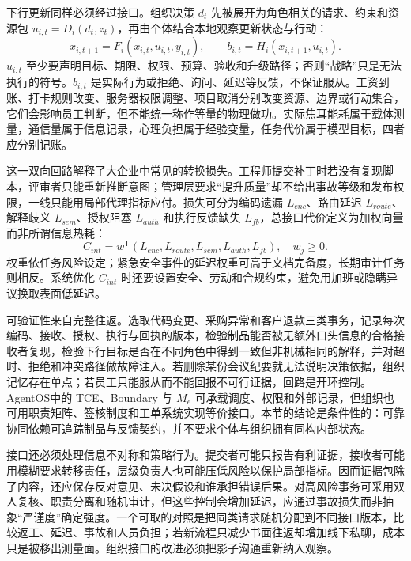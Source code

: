 下行更新同样必须经过接口。组织决策 $d_t$ 先被展开为角色相关的请求、约束和资源包 $u_{i,t}=D_i(d_t,z_t)$，再由个体结合本地观察更新状态与行动：
\begin{equation}
 x_{i,t+1}=F_i(x_{i,t},u_{i,t},y_{i,t}),\qquad b_{i,t}=H_i(x_{i,t+1},u_{i,t}).
\end{equation}
$u_{i,t}$ 至少要声明目标、期限、权限、预算、验收和升级路径；否则“战略”只是无法执行的符号。$b_{i,t}$ 是实际行为或拒绝、询问、延迟等反馈，不保证服从。工资到账、打卡规则改变、服务器权限调整、项目取消分别改变资源、边界或行动集合，它们会影响员工判断，但不能统一称作等量的物理做功。实际焦耳能耗属于载体测量，通信量属于信息记录，心理负担属于经验变量，任务代价属于模型目标，四者应分别记账。

这一双向回路解释了大企业中常见的转换损失。工程师提交补丁时若没有复现脚本，评审者只能重新推断意图；管理层要求“提升质量”却不给出事故等级和发布权限，一线只能用局部代理指标应付。损失可分为编码遗漏 $L_{enc}$、路由延迟 $L_{route}$、解释歧义 $L_{sem}$、授权阻塞 $L_{auth}$ 和执行反馈缺失 $L_{fb}$，总接口代价定义为加权向量而非所谓信息热耗：
\begin{equation}
 C_{int}=w^{\mathsf T}(L_{enc},L_{route},L_{sem},L_{auth},L_{fb}),\quad w_j\geq0.
\end{equation}
权重依任务风险设定；紧急安全事件的延迟权重可高于文档完备度，长期审计任务则相反。系统优化 $C_{int}$ 时还要设置安全、劳动和合规约束，避免用加班或隐瞒异议换取表面低延迟。

可验证性来自完整往返。选取代码变更、采购异常和客户退款三类事务，记录每次编码、接收、授权、执行与回执的版本，检验制品能否被无额外口头信息的合格接收者复现，检验下行目标是否在不同角色中得到一致但非机械相同的解释，并对超时、拒绝和冲突路径做故障注入。若删除某份会议纪要就无法说明决策依据，组织记忆存在单点；若员工只能服从而不能回报不可行证据，回路是开环控制。AgentOS中的 TCE、Boundary 与 $M_e$ 可承载调度、权限和外部记录，但组织也可用职责矩阵、签核制度和工单系统实现等价接口。本节的结论是条件性的：可靠协同依赖可追踪制品与反馈契约，并不要求个体与组织拥有同构内部状态。

接口还必须处理信息不对称和策略行为。提交者可能只报告有利证据，接收者可能用模糊要求转移责任，层级负责人也可能压低风险以保护局部指标。因而证据包除了内容，还应保存反对意见、未决假设和谁承担错误后果。对高风险事务可采用双人复核、职责分离和随机审计，但这些控制会增加延迟，应通过事故损失而非抽象“严谨度”确定强度。一个可取的对照是把同类请求随机分配到不同接口版本，比较返工、延迟、事故和人员负担；若新流程只减少书面往返却增加线下私聊，成本只是被移出测量面。组织接口的改进必须把影子沟通重新纳入观察。

